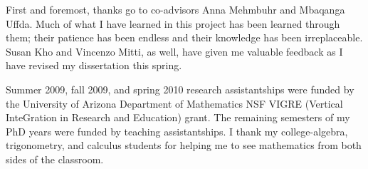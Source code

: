 First and foremost, thanks go to co-advisors Anna Mehmbuhr and Mbaqanga Uffda.
Much of what I have learned in this project has been learned through them;
their patience has been endless and their knowledge has been irreplaceable.
Susan Kho and Vincenzo Mitti, as well, have given me valuable feedback
as I have revised my dissertation this spring.

Summer 2009, fall 2009, and spring 2010 research assistantships were funded by
the University of Arizona Department of Mathematics NSF VIGRE (Vertical
InteGration in Research and Education) grant.  The remaining semesters of
my PhD years were funded by teaching assistantships.  I thank my
college-algebra, trigonometry, and calculus students for helping me to
see mathematics from both sides of the classroom.

\begin{vim_bug_workaround}
\end{vim_bug_workaround}
